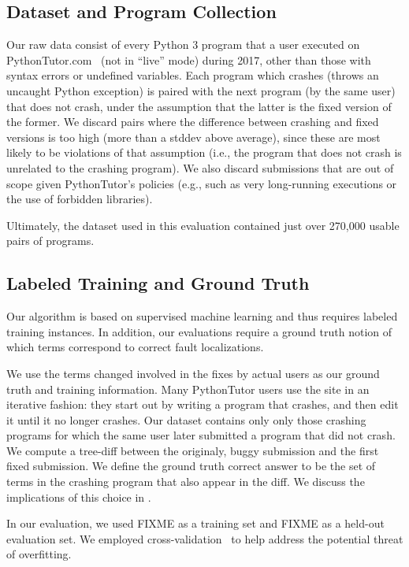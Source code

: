 \documentclass[conference]{IEEEtran}
\begin{document}
\subsection{Dataset and Program Collection}

Our raw data consist of every Python 3 program that a user executed on
PythonTutor.com~\cite{Guo2013-vu} (not in ``live'' mode) during 2017, other
than those with syntax errors or undefined variables.  Each program which
crashes (throws an uncaught Python exception) is paired with the next
program (by the same user) that does not crash, under the assumption that
the latter is the fixed version of the former. We discard pairs where the
difference between crashing and fixed versions is too high (more than a
stddev above average), since these are most likely to be violations of that
assumption (i.e., the program that does not crash is unrelated to the
crashing program). We also discard submissions that are out of scope given
PythonTutor's policies (e.g., such as very long-running executions or the
use of forbidden libraries). 

Ultimately, the dataset used in this evaluation contained just over
270,000 usable pairs of programs.

\subsection{Labeled Training and Ground Truth} 

Our algorithm is based on supervised machine learning and thus requires
labeled training instances. In addition, our evaluations require a ground
truth notion of which terms correspond to correct fault localizations. 

We use the terms changed involved in the fixes by actual users as our
ground truth and training information.  Many PythonTutor users use the site
in an iterative fashion: they start out by writing a program that crashes,
and then edit it until it no longer crashes. Our dataset contains only only
those crashing programs for which the same user later submitted a program
that did not crash. We compute a tree-diff \cite{tree-diff} between the
originaly, buggy submission and the first fixed submission. We define 
the ground truth correct answer to be the set of terms in the crashing
program that also appear in the diff. We discuss the implications of this
choice in . 

In our evaluation, we used FIXME as a training set and FIXME as a held-out
evaluation set. We employed cross-validation~\cite{kohavi} to help address
the potential threat of overfitting.
\end{document}
